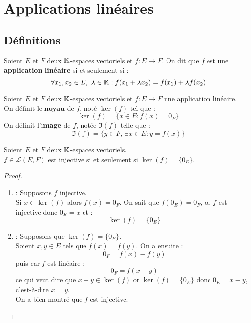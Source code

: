 \chapter{Applications linéaires}
\def\arraystretch{1}

\section{Définitions}
\begin{definition}
    Soient $E$ et $F$ deux $\mathbb{K}$-espaces vectoriels et $f : E \to F$.
    On dit que $f$ est une \textbf{application linéaire} si et seulement si : 
    \[ \forall x_1, x_2 \in E,\ \lambda \in \mathbb{K} : f(x_1 + \lambda x_2) = f(x_1) + \lambda f(x_2) \]
\end{definition}

\begin{definition}
    Soient $E$ et $F$ deux $\mathbb{K}$-espaces vectoriels et $f : E \to F$ une application linéaire.
    \\
    On définit le \textbf{noyau} de $f$, noté $\ker(f)$ tel que :
    \[ \ker(f) = \{ x \in E : f(x) = 0_F \} \] 
    On définit l'\textbf{image} de $f$, notée $\Im(f)$ telle que :
    \[ \Im(f) = \{ y \in F,\ \exists x \in E : y = f(x) \} \]
\end{definition}

\begin{theorem}
	Soient $E$ et $F$ deux $\mathbb{K}$-espaces vectoriels. \\
	$f \in \mathcal{L}(E, F)$ est injective si et seulement si $\ker(f) = \{ 0_E \}$.
\end{theorem}

\begin{proof}
	\leavevmode
	\begin{enumerate}
		\item \boxed{\implies} : Supposons $f$ injective.
		\\
		Si $x \in \ker(f)$ alors $f(x) = 0_F$. On sait que $f(0_E) = 0_F$, or $f$ est injective donc $0_E = x$ et :
		\[ \ker(f) = \{ 0_E \} \]
		\item \boxed{\impliedby} : Supposons que $\ker(f) = \{ 0_E \}$.
		\\
		Soient $x, y \in E$ tels que $f(x) = f(y)$.
		On a ensuite :
		\[ 0_F = f(x) - f(y) \]
		puis car $f$ est linéaire :
		\[ 0_F = f(x - y) \]
		ce qui veut dire que $x - y \in \ker(f)$ or $\ker(f) = \{ 0_E \}$ donc $0_E = x - y$, c'est-à-dire $x = y$.
		\\
		On a bien montré que $f$ est injective.
	\end{enumerate}
\end{proof}

